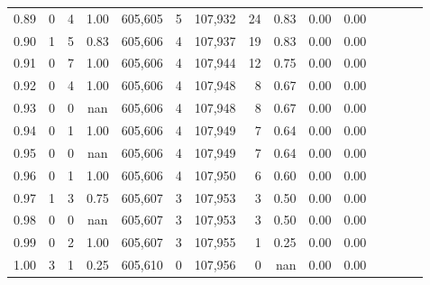 \begin{tabular}{rrrcrrrrrrrrrrr}
0.89 &       0 &      4 &                                       1.00 &  605,605 &        5 &  107,932 &       24 &  0.83 &  0.00 &                         0.00 \\
0.90 &       1 &      5 &                                       0.83 &  605,606 &        4 &  107,937 &       19 &  0.83 &  0.00 &                         0.00 \\
0.91 &       0 &      7 &                                       1.00 &  605,606 &        4 &  107,944 &       12 &  0.75 &  0.00 &                         0.00 \\
0.92 &       0 &      4 &                                       1.00 &  605,606 &        4 &  107,948 &        8 &  0.67 &  0.00 &                         0.00 \\
0.93 &       0 &      0 &                                        nan &  605,606 &        4 &  107,948 &        8 &  0.67 &  0.00 &                         0.00 \\
0.94 &       0 &      1 &                                       1.00 &  605,606 &        4 &  107,949 &        7 &  0.64 &  0.00 &                         0.00 \\
0.95 &       0 &      0 &                                        nan &  605,606 &        4 &  107,949 &        7 &  0.64 &  0.00 &                         0.00 \\
0.96 &       0 &      1 &                                       1.00 &  605,606 &        4 &  107,950 &        6 &  0.60 &  0.00 &                         0.00 \\
0.97 &       1 &      3 &                                       0.75 &  605,607 &        3 &  107,953 &        3 &  0.50 &  0.00 &                         0.00 \\
0.98 &       0 &      0 &                                        nan &  605,607 &        3 &  107,953 &        3 &  0.50 &  0.00 &                         0.00 \\
0.99 &       0 &      2 &                                       1.00 &  605,607 &        3 &  107,955 &        1 &  0.25 &  0.00 &                         0.00 \\
1.00 &       3 &      1 &                                       0.25 &  605,610 &        0 &  107,956 &        0 &   nan &  0.00 &                         0.00 \\
\bottomrule
\end{tabular}
